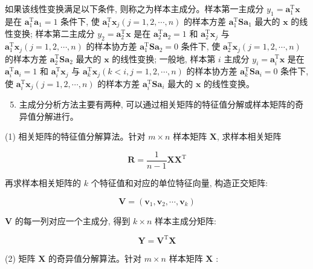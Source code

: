 \documentclass[10pt]{article}
\begin{document}
如果该线性变换满足以下条件, 则称之为样本主成分。样本第一主成分 $y_{1}=\boldsymbol{a}_{1}^{\mathrm{T}} \boldsymbol{x}$ 是在 $\boldsymbol{a}_{1}^{\mathrm{T}} \boldsymbol{a}_{1}=1$ 条件下, 使 $\boldsymbol{a}_{1}^{\mathrm{T}} \boldsymbol{x}_{j}(j=1,2, \cdots, n)$ 的样本方差 $\boldsymbol{a}_{1}^{\mathrm{T}} \boldsymbol{S} \boldsymbol{a}_{1}$ 最大的 $\boldsymbol{x}$ 的线性变换; 样本第二主成分 $y_{2}=\boldsymbol{a}_{2}^{\mathrm{T}} \boldsymbol{x}$ 是在 $\boldsymbol{a}_{2}^{\mathrm{T}} \boldsymbol{a}_{2}=1$ 和 $\boldsymbol{a}_{2}^{\mathrm{T}} \boldsymbol{x}_{j}$ 与 $\boldsymbol{a}_{1}^{\mathrm{T}} \boldsymbol{x}_{j}(j=1,2, \cdots, n)$ 的样本协方差 $\boldsymbol{a}_{1}^{\mathrm{T}} \boldsymbol{S} \boldsymbol{a}_{2}=0$ 条件下, 使 $\boldsymbol{a}_{2}^{\mathrm{T}} \boldsymbol{x}_{j}(j=1,2, \cdots, n)$ 的样本方差 $\boldsymbol{a}_{2}^{\mathrm{T}} \boldsymbol{S} \boldsymbol{a}_{2}$ 最大的 $\boldsymbol{x}$ 的线性变换; 一般地, 样本第 $i$ 主成分 $y_{i}=\boldsymbol{a}_{i}^{\mathrm{T}} \boldsymbol{x}$ 是在 $\boldsymbol{a}_{i}^{\mathrm{T}} \boldsymbol{a}_{i}=1$ 和 $\boldsymbol{a}_{i}^{\mathrm{T}} \boldsymbol{x}_{j}$ 与 $\boldsymbol{a}_{k}^{\mathrm{T}} \boldsymbol{x}_{j}(k<i, j=1,2, \cdots, n)$ 的样本协方差 $\boldsymbol{a}_{k}^{\mathrm{T}} \boldsymbol{S} \boldsymbol{a}_{i}=0$ 条件下, 使 $\boldsymbol{a}_{i}^{\mathrm{T}} \boldsymbol{x}_{j}(j=1,2, \cdots, n)$ 的样本方差 $\boldsymbol{a}_{i}^{\mathrm{T}} \boldsymbol{S} \boldsymbol{a}_{i}$ 最大的 $\boldsymbol{x}$ 的线性变换。

\begin{enumerate}
  \setcounter{enumi}{4}
  \item 主成分分析方法主要有两种, 可以通过相关矩阵的特征值分解或样本矩阵的奇异值分解进行。
\end{enumerate}

(1) 相关矩阵的特征值分解算法。针对 $m \times n$ 样本矩阵 $\boldsymbol{X}$, 求样本相关矩阵

$$
\boldsymbol{R}=\frac{1}{n-1} \boldsymbol{X} \boldsymbol{X}^{\mathrm{T}}
$$

再求样本相关矩阵的 $k$ 个特征值和对应的单位特征向量, 构造正交矩阵:

$$
\boldsymbol{V}=\left(\boldsymbol{v}_{1}, \boldsymbol{v}_{2}, \cdots, \boldsymbol{v}_{k}\right)
$$

$\boldsymbol{V}$ 的每一列对应一个主成分, 得到 $k \times n$ 样本主成分矩阵:

$$
\boldsymbol{Y}=\boldsymbol{V}^{\mathrm{T}} \boldsymbol{X}
$$

(2) 矩阵 $\boldsymbol{X}$ 的奇异值分解算法。针对 $m \times n$ 样本矩阵 $\boldsymbol{X}$ :
\end{document}

